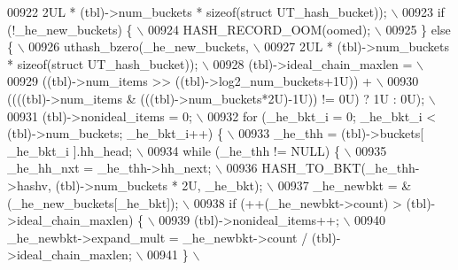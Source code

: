 \begin{DoxyCode}
{{{{{{{{{00922 \textcolor{preprocessor}{           2UL * (tbl)->num\_buckets * sizeof(struct UT\_hash\_bucket));            \(\backslash\)}
00923 \textcolor{preprocessor}{  if (!\_he\_new\_buckets) \{                                                        \(\backslash\)}
00924 \textcolor{preprocessor}{    HASH\_RECORD\_OOM(oomed);                                                      \(\backslash\)}
00925 \textcolor{preprocessor}{  \} else \{                                                                       \(\backslash\)}
00926 \textcolor{preprocessor}{    uthash\_bzero(\_he\_new\_buckets,                                                \(\backslash\)}
00927 \textcolor{preprocessor}{        2UL * (tbl)->num\_buckets * sizeof(struct UT\_hash\_bucket));               \(\backslash\)}
00928 \textcolor{preprocessor}{    (tbl)->ideal\_chain\_maxlen =                                                  \(\backslash\)}
00929 \textcolor{preprocessor}{       ((tbl)->num\_items >> ((tbl)->log2\_num\_buckets+1U)) +                      \(\backslash\)}
00930 \textcolor{preprocessor}{       ((((tbl)->num\_items & (((tbl)->num\_buckets*2U)-1U)) != 0U) ? 1U : 0U);    \(\backslash\)}
00931 \textcolor{preprocessor}{    (tbl)->nonideal\_items = 0;                                                   \(\backslash\)}
00932 \textcolor{preprocessor}{    for (\_he\_bkt\_i = 0; \_he\_bkt\_i < (tbl)->num\_buckets; \_he\_bkt\_i++) \{           \(\backslash\)}
00933 \textcolor{preprocessor}{      \_he\_thh = (tbl)->buckets[ \_he\_bkt\_i ].hh\_head;                             \(\backslash\)}
00934 \textcolor{preprocessor}{      while (\_he\_thh != NULL) \{                                                  \(\backslash\)}
00935 \textcolor{preprocessor}{        \_he\_hh\_nxt = \_he\_thh->hh\_next;                                           \(\backslash\)}
00936 \textcolor{preprocessor}{        HASH\_TO\_BKT(\_he\_thh->hashv, (tbl)->num\_buckets * 2U, \_he\_bkt);           \(\backslash\)}
00937 \textcolor{preprocessor}{        \_he\_newbkt = &(\_he\_new\_buckets[\_he\_bkt]);                                \(\backslash\)}
00938 \textcolor{preprocessor}{        if (++(\_he\_newbkt->count) > (tbl)->ideal\_chain\_maxlen) \{                 \(\backslash\)}
00939 \textcolor{preprocessor}{          (tbl)->nonideal\_items++;                                               \(\backslash\)}
00940 \textcolor{preprocessor}{          \_he\_newbkt->expand\_mult = \_he\_newbkt->count / (tbl)->ideal\_chain\_maxlen; \(\backslash\)}
00941 \textcolor{preprocessor}{        \}                                                                        \(\backslash\)}
}}}}}}}}}
\end{DoxyCode}
